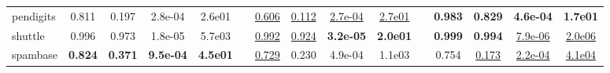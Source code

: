 \documentclass[10pt]{beamer}
\begin{document}
\begin{frame}
\begin{table}[!ht]
{\begin{tabular}{l cccc c cccc c cccc}
pendigits    &0.811 &0.197 &2.8e-04&2.6e01 & &\underline{0.606} &\underline{0.112} &\underline{2.7e-04}&\underline{2.7e01}   & &\bf 0.983 &\bf 0.829 &\bf 4.6e-04&\bf 1.7e01 \\
shuttle      &0.996 &0.973 &1.8e-05&5.7e03 & &\underline{0.992} &\underline{0.924} &\bf 3.2e-05&\bf 2.0e01   & &\bf 0.999 &\bf 0.994 &\underline{7.9e-06}&\underline{2.0e06} \\
spambase     &\bf 0.824 &\bf 0.371 &\bf 9.5e-04&\bf 4.5e01&  &\underline{0.729} &0.230 &4.9e-04&1.1e03  &  &0.754 &\underline{0.173} &\underline{2.2e-04}&\underline{4.1e04} \\
\bottomrule
\end{tabular}
}
\end{table}

\end{frame}
\end{document}
